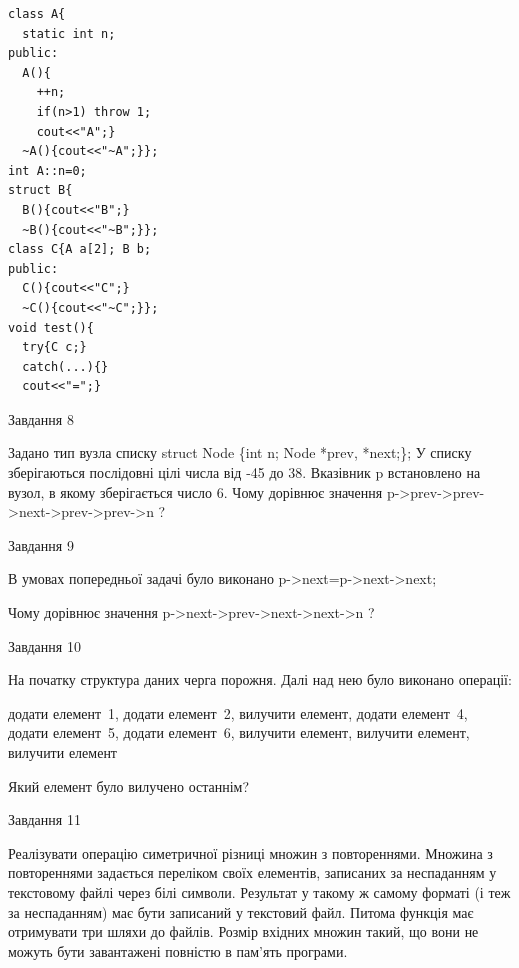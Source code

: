 \documentclass[12pt, ukrainian]{article}
\begin{document}
{{{{{\begin{minipage}[t]{7cm}
\begin{verbatim}
class A{
  static int n;
public:
  A(){
    ++n; 
    if(n>1) throw 1;
    cout<<"A";}
  ~A(){cout<<"~A";}};
int A::n=0;
struct B{
  B(){cout<<"B";}
  ~B(){cout<<"~B";}};
class C{A a[2]; B b;
public:
  C(){cout<<"C";}
  ~C(){cout<<"~C";}};
void test(){
  try{C c;} 
  catch(...){} 
  cout<<"=";}
\end{verbatim}            


\end{minipage}
               
{\begin{center}Завдання {8}\end{center}}
\vspace{-6mm}
Задано тип вузла списку
struct Node \{int n; Node *prev, *next;\};
У списку зберігаються послідовні цілі числа від -45 до 38. Вказівник p встановлено на вузол, в якому зберігається число 6.
Чому дорівнює значення p->prev->prev->next->prev->prev->n ?\par

               
{\begin{center}Завдання {9}\end{center}}
\vspace{-6mm}
В умовах попередньої задачі було виконано p->next=p->next->next;

Чому дорівнює значення p->next->prev->next->next->n ?\par

\newpage
               
{\begin{center}Завдання {10}\end{center}}
\vspace{-6mm}
На початку структура даних черга порожня. Далі над нею було виконано операції:

додати елемент~1, додати елемент~2, вилучити елемент, додати елемент~4, додати елемент~5, додати елемент~6, вилучити елемент, вилучити елемент, вилучити елемент

Який елемент було вилучено останнім?\par

               
{\begin{center}Завдання {11}\end{center}}
\vspace{-6mm}

Реалізувати операцію симетричної різниці множин з повтореннями. Множина з повтореннями задається переліком своїх елементів, записаних за неспаданням у текстовому файлі через білі символи. Результат у такому ж самому форматі (і теж за неспаданням) має бути записаний у текстовий файл. Питома функція має отримувати три шляхи до файлів. Розмір вхідних множин такий, що вони не можуть бути завантажені повністю в пам’ять програми.

}}}}}
\end{document}
